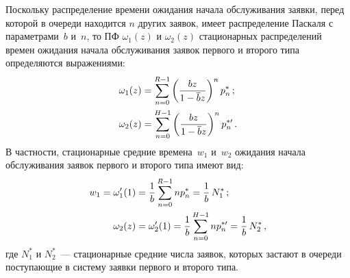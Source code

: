 \begin{multicols}{2}
Поскольку распределение времени ожидания начала
обслуживания заявки, перед которой в очереди
находится $n$ других заявок, имеет распределение
Паскаля с параметрами~$b$ и~$n$, то ПФ $\omega_1(z)$
и $\omega_2(z)$ стационарных распределений времен
ожидания начала обслуживания заявок первого и
второго типа определяются выражениями:
\begin{align*}
\omega_1(z)&=\sum\limits_{n=0}^{R-1}
\left(\displaystyle\frac{\displaystyle bz\mathstrut}{\displaystyle 1 - \overline{b} z\mathstrut}\right)^n p^*_{n}\,;
\\
\omega_2(z)&=\sum\limits_{n=0}^{H-1}
\left(\displaystyle\frac{\displaystyle bz\mathstrut}{\displaystyle 1 - \overline{b} z\mathstrut}\right)^n p^{*\prime}_{n}\,.
\end{align*}
В частности, стационарные средние времена~$w_1$ и~$w_2$
ожидания начала обслуживания заявок первого и второго типа имеют вид:
\begin{align*}
w_1=\omega'_1(1)&=
\displaystyle\frac{\displaystyle 1\mathstrut}{\displaystyle b\mathstrut} \sum\limits_{n=0}^{R-1} n  p^*_{n}=
\displaystyle\frac{\displaystyle 1\mathstrut}{\displaystyle b\mathstrut}\, N_1^* \,;
\\
\omega_2(z)&= \omega'_2(1) =
\displaystyle\frac{\displaystyle 1\mathstrut}{\displaystyle b\mathstrut}\sum\limits_{n=0}^{H-1} n p^{*\prime}_{n}
=\displaystyle\frac{\displaystyle 1\mathstrut}{\displaystyle b\mathstrut}\, N_2^* \,,
\end{align*}
где $N_1^*$ и $N_2^*$~--- стационарные средние
числа заявок,
 которых застают в очереди
поступающие в систему заявки первого и второго типа.

\begin{figure*}[b] %
\vspace*{1pt}
\begin{center}
\mbox{%
\epsfxsize=162.499mm
}
\end{center}
\vspace*{-12pt}
\vspace*{9pt}
\begin{center}
\mbox{%
\epsfxsize=161.119mm
}
\end{center}
\vspace*{-12pt}
\begin{minipage}[t]{80mm}
  \end{minipage}
  \hfill
  \vspace*{-12pt}
  \begin{minipage}[t]{80mm}
\end{minipage}
\vspace*{6pt}
\end{figure*}





\end{multicols}
